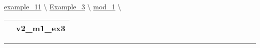 \hypertarget{ecldoc:inintest.example_3.mod_1.v2_m1_ex3}{}
\hspace{0pt} \hyperlink{ecldoc:example_11}{example_11} \textbackslash 
\hspace{0pt} \hyperlink{ecldoc:Inintest.Example_3}{Example_3} \textbackslash 
\hspace{0pt} \hyperlink{ecldoc:Inintest.Example_3.mod_1}{mod_1} \textbackslash 

{\renewcommand{\arraystretch}{1.5}
\begin{tabularx}{\textwidth}{|>{\raggedright\arraybackslash}l|X|}
\hline
\hspace{0pt}\mytexttt{\color{red} } & \textbf{v2\_m1\_ex3} \\
\hline
\end{tabularx}
}

\par


\rule{\linewidth}{0.5pt}






